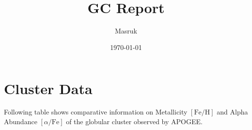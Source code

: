 \documentclass[a4paper,12pt]{article}
\title{GC Report}
\author{Masruk}
\date{\today}
\begin{document}
\maketitle


\tableofcontents



\section{Cluster Data}

Following table shows comparative information on Metallicity $[\text{Fe/H}]$ and Alpha Abundance $[\alpha/\text{Fe}]$ of the globular cluster observed by APOGEE.
\end{document}
